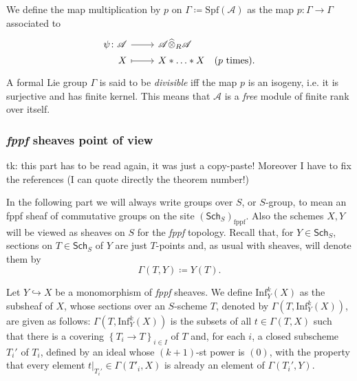 \documentclass[../Main]{subfiles}
\begin{document}
\begin{defn}
	We define the map multiplication by $p$ on $\Gamma \coloneqq \mathrm{Spf}(\mathscr{A})$
	as the map $p\colon \Gamma \to \Gamma$
	associated to 
	\begin{equation*}
	\begin{tikzcd}[row sep = 0ex
		,/tikz/column 1/.append style={anchor=base east}
		,/tikz/column 2/.append style={anchor=base west}]
		\psi\colon \mathscr{A} \arrow[r, "", rightarrow] &
		\mathscr{A} \widehat{\otimes}_R \mathscr{A} \\
		X \arrow[r, "", mapsto] & 
		X \ast \ldots \ast X
	\quad \text{($p$ times)}
	.\end{tikzcd}
	\end{equation*} 
	A formal Lie group $\Gamma$ is said to be {\em divisible} iff the map $p$ is 
	an isogeny, i.e. it is surjective and has finite kernel.
	This means that $\mathscr{A}$ is a {\em free} module of finite rank over itself.
\end{defn}



\subsubsection{{\em fppf} sheaves point of view}
tk: this part has to be read again, it was just a copy-paste!
Moreover I have to fix the references (I can quote directly the theorem number!)

In the following part we will always write groups over $S$, or $S$-group, to mean
an fppf sheaf of commutative groups on the site $(\mathsf{Sch}_{ S })_{\mathrm{fppf}}$.
Also the schemes $X, Y$ will be viewed as sheaves on $S$
for the {\em fppf} topology.
Recall that, for $Y \in \mathsf{Sch}_{ S }$, sections on
$T \in \mathsf{Sch}_{ S }$ of $Y$ are just $T$-points and,
as usual with sheaves, will denote them by
\begin{equation*}
	\Gamma \left( T, Y \right) \coloneqq Y(T)
.\end{equation*}


\begin{defn}\label{defn:kInfNeighbourhood}
	Let $Y \hookrightarrow X$ be a monomorphism of {\em fppf} sheaves.
	We define $\mathrm{Inf}_Y^k(X)$ as the subsheaf of $X$,
	whose sections over an $S$-scheme $T$, denoted by $\Gamma ( T , \mathrm{Inf}_Y^k(X) )$,
	are given as follows:
	$\Gamma ( T , \mathrm{Inf}_Y^k(X) )$ is the subsets of all
	$t \in \Gamma \left( T, X \right)$ such that
	there is a covering $\left\{ T_{ i } \to T \right\}_{ i \in I }$
	of $T$ and, for each $i$, a closed subscheme $T_i'$ of $T_i$,
	defined by an ideal whose $(k+1)$-st power is $(0)$,
	with the property that every element $\left.t\right|_{T_i'} \in \Gamma(T'_i, X)$
	is already an element of $\Gamma(T_i', Y)$.
\end{defn}
\end{document}
